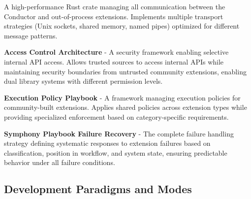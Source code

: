 \begin{description}[leftmargin=4cm,labelwidth=3.5cm]

\item[\textbf{IPC Bus}] A high-performance Rust crate managing all communication between the Conductor and out-of-process extensions. Implements multiple transport strategies (Unix sockets, shared memory, named pipes) optimized for different message patterns.

\item[\textbf{ACA}] \textbf{Access Control Architecture} - A security framework enabling selective internal API access. Allows trusted sources to access internal APIs while maintaining security boundaries from untrusted community extensions, enabling dual library systems with different permission levels.

\item[\textbf{EPP}] \textbf{Execution Policy Playbook} - A framework managing execution policies for community-built extensions. Applies shared policies across extension types while providing specialized enforcement based on category-specific requirements.

\item[\textbf{SPFR}] \textbf{Symphony Playbook Failure Recovery} - The complete failure handling strategy defining systematic responses to extension failures based on classification, position in workflow, and system state, ensuring predictable behavior under all failure conditions.

\end{description}

\subsection*{Development Paradigms and Modes}

